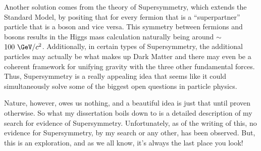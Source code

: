 Another solution comes from the theory of Supersymmetry, which extends the Standard Model, by positing that for every fermion that is a ``superpartner'' particle that is a boson and vice versa.
This symmetry between fermions and bosons results in the Higgs mass calculation naturally being around $\sim$$100~\GeV/c^2$.
Additionally, in certain types of Supersymmetry, the additional particles may actually be what makes up Dark Matter and there may even be a coherent framework for unifying gravity with the three other fundamental forces.
Thus, Supersymmetry is a really appealing idea that seems like it could simultaneously solve some of the biggest open questions in particle physics.

Nature, however, owes us nothing, and a beautiful idea is just that until proven otherwise.
So what my dissertation boils down to is a detailed description of my search for evidence of Supersymmetry.
Unfortunately, as of the writing of this, no evidence for Supersymmetry, by my search or any other, has been observed.
But, this is an exploration, and as we all know, it's always the last place you look!
